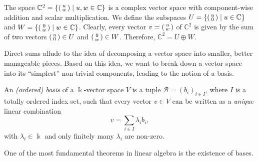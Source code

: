 \documentclass[a4paper, oneside, 12pt]{amsart}
\begin{document}
\begin{example}\label{ex:direct-sum-c2}
  The space \( \mathbb{C}^2=\{\begin{psmallmatrix} u \\ w \end{psmallmatrix} \mid u,w \in \mathbb{C}
  \}\) is a complex vector space with component-wise addition and scalar multiplication.
  We define the subspaces
  \(U = \{\begin{psmallmatrix} u \\ 0 \end{psmallmatrix} \mid u \in \mathbb{C}\}\) and \(W = \{\begin{psmallmatrix} 0 \\ w \end{psmallmatrix} \mid w \in \mathbb{C}\}\).
  Clearly, every vector \(v =
  \begin{psmallmatrix}
    u \\ w
  \end{psmallmatrix}
  \) of \(\mathbb{C}^{2}\) is given by the sum of two vectors \(
  \begin{psmallmatrix}
    u \\0
  \end{psmallmatrix} \in U
  \) and \(
  \begin{psmallmatrix}
    0 \\ w
  \end{psmallmatrix}
  \in W
  \).
  Therefore, \( \mathbb{C}^{2}= U \oplus W\).
\end{example}

Direct sums allude to the idea of decomposing a vector space into smaller, better manageable pieces.
Based on this idea, we want to break down a vector space into its ``simplest'' non-trivial components, leading to the notion of a basis.


\begin{definition}\label{def:basis}
  An \emph{(ordered) basis} of a \(\Bbbk\)-vector space \( V \) is a tuple \( \mathcal{B} = (b_i)_{i \in I} \), where \( I \) is a totally ordered index set, such that every vector \( v \in V \) can be written as a \emph{unique} linear combination
  \begin{equation*}
    v = \sum_{i \in I} \lambda_i b_i,
  \end{equation*}
  with \( \lambda_i \in  \Bbbk \) and only finitely many \( \lambda_i \) are non-zero.
\end{definition}

One of the most fundamental theorems in linear algebra is the existence of bases.
\end{document}

